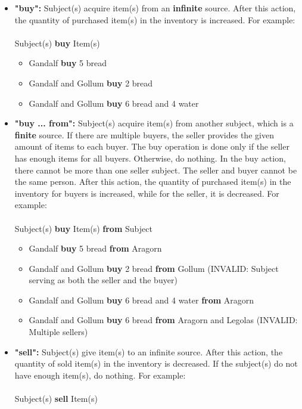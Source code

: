 \documentclass[12pt]{article}
\begin{document}
\begin{itemize}

\item \textbf{"buy":} Subject(s) acquire item(s) from an \textbf{infinite} source. After this action, the quantity of purchased item(s) in the inventory is increased. For example:\\\\
Subject(s) \textbf{buy} Item(s)
        \begin{itemize}
        \item Gandalf \textbf{buy} 5 bread
        \item Gandalf and Gollum \textbf{buy} 2 bread
        \item Gandalf and Gollum \textbf{buy} 6 bread and 4 water \\

        \end{itemize}
        
\item \textbf{"buy ... from":} Subject(s) acquire item(s) from another subject, which is a \textbf{finite} source. If there are multiple buyers, the seller provides the given amount of items to each buyer. The buy operation is done only if the seller has enough items for all buyers. Otherwise, do nothing. In the buy action, there cannot be more than one seller subject. The seller and buyer cannot be the same person. After this action, the quantity of purchased item(s) in the inventory for buyers is increased, while for the seller, it is decreased. For example:\\\\
Subject(s) \textbf{buy} Item(s) \textbf{from} Subject
        \begin{itemize}

        \item Gandalf \textbf{buy} 5 bread \textbf{from} Aragorn
        \item Gandalf and Gollum \textbf{buy} 2 bread \textbf{from} Gollum (INVALID: Subject serving as both the seller and the buyer)
        \item Gandalf and Gollum \textbf{buy} 6 bread and 4 water \textbf{from} Aragorn
        \item Gandalf and Gollum \textbf{buy} 6 bread \textbf{from} Aragorn and Legolas (INVALID: Multiple sellers) 

        \end{itemize}
\item \textbf{"sell":} Subject(s) give item(s) to an infinite source. After this action, the quantity of sold item(s) in the inventory is decreased. If the subject(s) do not have enough item(s), do nothing. For example: \\\\
Subject(s) \textbf{sell} Item(s)
\begin{itemize}


\end{itemize}
\end{itemize}
\end{document}
